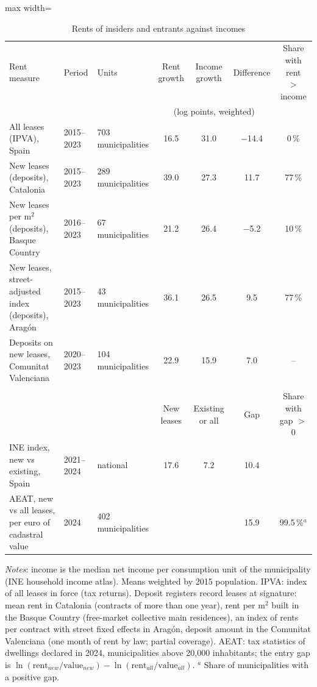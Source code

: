 \begin{table}[!htbp]\centering\small
\caption{Rents of insiders and entrants against incomes}\label{tab:facts}
\begin{adjustbox}{max width=\linewidth}\begin{tabular}{lllcccc}\toprule
Rent measure & Period & Units & Rent growth & Income growth & Difference & Share with rent $>$ income\\
 & & & \multicolumn{3}{c}{(log points, weighted)} & \\\midrule
All leases (IPVA), Spain & 2015--2023 & 703 municipalities & 16.5 & 31.0 & $-$14.4 & 0\,\%\\
New leases (deposits), Catalonia & 2015--2023 & 289 municipalities & 39.0 & 27.3 & 11.7 & 77\,\%\\
New leases per m$^2$ (deposits), Basque Country & 2016--2023 & 67 municipalities & 21.2 & 26.4 & $-$5.2 & 10\,\%\\
New leases, street-adjusted index (deposits), Aragón & 2015--2023 & 43 municipalities & 36.1 & 26.5 & 9.5 & 77\,\%\\
Deposits on new leases, Comunitat Valenciana & 2020--2023 & 104 municipalities & 22.9 & 15.9 & 7.0 & --\\
\addlinespace
\multicolumn{7}{l}{\textit{Entry gap: new leases relative to leases in force}}\\
 & & & New leases & Existing or all & Gap & Share with gap $>$ 0\\
INE index, new vs existing, Spain & 2021--2024 & national & 17.6 & 7.2 & 10.4 & \\
AEAT, new vs all leases, per euro of cadastral value & 2024 & 402 municipalities & & & 15.9 & 99.5\,\%$^a$\\
\bottomrule\end{tabular}\end{adjustbox}
\begin{minipage}{0.97\linewidth}\footnotesize\vspace{4pt}
\textit{Notes}: income is the median net income per consumption unit of the municipality (INE household income atlas). Means weighted by 2015 population. IPVA: index of all leases in force (tax returns). Deposit registers record leases at signature: mean rent in Catalonia (contracts of more than one year), rent per m$^2$ built in the Basque Country (free-market collective main residences), an index of rents per contract with street fixed effects in Aragón, deposit amount in the Comunitat Valenciana (one month of rent by law; partial coverage). AEAT: tax statistics of dwellings declared in 2024, municipalities above 20,000 inhabitants; the entry gap is $\ln(\text{rent}_{new}/\text{value}_{new})-\ln(\text{rent}_{all}/\text{value}_{all})$. $^a$ Share of municipalities with a positive gap.
\end{minipage}\end{table}